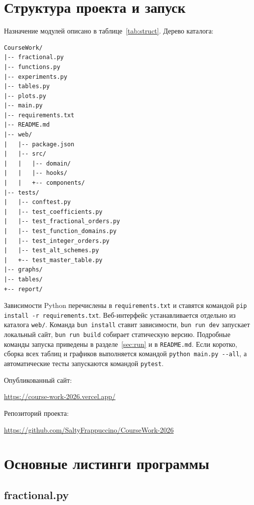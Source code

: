\documentclass[14pt,a4paper]{extarticle}
\newcommand{\appnumberline}[1]{#1\quad}
\begin{document}
\clearpage
\appendix
{}
\renewcommand{\thesection}{Приложение~\Asbuk{section}}
\renewcommand{\thesubsection}{\Asbuk{section}.\arabic{subsection}}
\section{Структура проекта и запуск}

Назначение модулей описано в таблице~\ref{tab:struct}. Дерево каталога:

\begin{lstlisting}
CourseWork/
|-- fractional.py
|-- functions.py
|-- experiments.py
|-- tables.py
|-- plots.py
|-- main.py
|-- requirements.txt
|-- README.md
|-- web/
|   |-- package.json
|   |-- src/
|   |   |-- domain/
|   |   |-- hooks/
|   |   +-- components/
|-- tests/
|   |-- conftest.py
|   |-- test_coefficients.py
|   |-- test_fractional_orders.py
|   |-- test_function_domains.py
|   |-- test_integer_orders.py
|   |-- test_alt_schemes.py
|   +-- test_master_table.py
|-- graphs/
|-- tables/
+-- report/
\end{lstlisting}

Зависимости Python перечислены в \texttt{requirements.txt} и ставятся командой \texttt{pip install -r requirements.txt}. Веб-интерфейс устанавливается отдельно из каталога \texttt{web/}. Команда \texttt{bun install} ставит зависимости, \texttt{bun run dev} запускает локальный сайт, \texttt{bun run build} собирает статическую версию. Подробные команды запуска приведены в разделе~\ref{sec:run} и в \texttt{README.md}. Если коротко, сборка всех таблиц и графиков выполняется командой \texttt{python main.py -{}-all}, а автоматические тесты запускаются командой \texttt{pytest}.

Опубликованный сайт:
\begin{flushleft}
\small\url{https://course-work-2026.vercel.app/}
\end{flushleft}

Репозиторий проекта:
\begin{flushleft}
\small\url{https://github.com/SaltyFrappuccino/CourseWork-2026}
\end{flushleft}

\section{Основные листинги программы}

\subsection{fractional.py}

\end{document}
